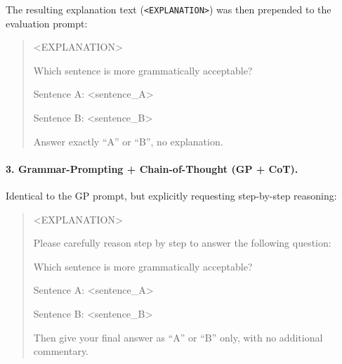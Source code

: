 \documentclass[11pt]{article}
\begin{document}
The resulting explanation text (\texttt{<EXPLANATION>}) was then prepended to the evaluation prompt:
\begin{quote}
<EXPLANATION>

Which sentence is more grammatically acceptable?  

Sentence A: <sentence\_A>  

Sentence B: <sentence\_B>  

Answer exactly ``A'' or ``B'', no explanation.
\end{quote}

\paragraph{3. Grammar-Prompting + Chain-of-Thought (GP + CoT).}
Identical to the GP prompt, but explicitly requesting step-by-step reasoning:
\begin{quote}
<EXPLANATION>

Please carefully reason step by step to answer the following question:  

Which sentence is more grammatically acceptable?  

Sentence A: <sentence\_A>  

Sentence B: <sentence\_B>  

Then give your final answer as ``A'' or ``B'' only, with no additional commentary.
\end{quote}



\onecolumn
\end{document}
